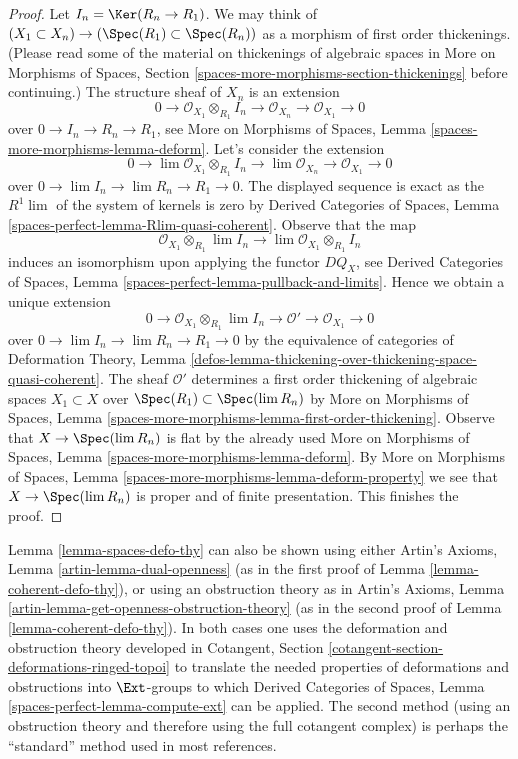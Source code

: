 \begin{proof}
\medskip\noindent
Let $I_n = \Ker(R_n \to R_1)$. We may think of
$(X_1 \subset X_n) \to (\Spec(R_1) \subset \Spec(R_n))$
as a morphism of first order thickenings. (Please read some of the material
on thickenings of algebraic spaces in More on Morphisms of Spaces, Section
\ref{spaces-more-morphisms-section-thickenings}
before continuing.) The structure sheaf of $X_n$ is an extension
$$
0 \to \mathcal{O}_{X_1} \otimes_{R_1} I_n \to
\mathcal{O}_{X_n} \to \mathcal{O}_{X_1} \to 0
$$
over $0 \to I_n \to R_n \to R_1$, see
More on Morphisms of Spaces, Lemma
\ref{spaces-more-morphisms-lemma-deform}.
Let's consider the extension
$$
0 \to \lim \mathcal{O}_{X_1} \otimes_{R_1} I_n \to
\lim \mathcal{O}_{X_n} \to \mathcal{O}_{X_1} \to 0
$$
over $0 \to \lim I_n \to \lim R_n \to R_1 \to 0$.
The displayed sequence is exact as the $R^1\lim$ of the system
of kernels is zero by Derived Categories of Spaces, Lemma
\ref{spaces-perfect-lemma-Rlim-quasi-coherent}.
Observe that the map
$$
\mathcal{O}_{X_1} \otimes_{R_1} \lim I_n \longrightarrow
\lim \mathcal{O}_{X_1} \otimes_{R_1} I_n
$$
induces an isomorphism upon applying the functor $DQ_X$, see
Derived Categories of Spaces, Lemma
\ref{spaces-perfect-lemma-pullback-and-limits}.
Hence we obtain a unique extension
$$
0 \to \mathcal{O}_{X_1} \otimes_{R_1} \lim I_n \to
\mathcal{O}' \to \mathcal{O}_{X_1} \to 0
$$
over $0 \to \lim I_n \to \lim R_n \to R_1 \to 0$
by the equivalence of categories of
Deformation Theory, Lemma
\ref{defos-lemma-thickening-over-thickening-space-quasi-coherent}.
The sheaf $\mathcal{O}'$ determines
a first order thickening of algebraic spaces $X_1 \subset X$
over $\Spec(R_1) \subset \Spec(\lim R_n)$
by More on Morphisms of Spaces, Lemma
\ref{spaces-more-morphisms-lemma-first-order-thickening}.
Observe that $X \to \Spec(\lim R_n)$ is flat by the already
used More on Morphisms of Spaces, Lemma
\ref{spaces-more-morphisms-lemma-deform}.
By More on Morphisms of Spaces, Lemma
\ref{spaces-more-morphisms-lemma-deform-property}
we see that $X \to \Spec(\lim R_n)$ is proper
and of finite presentation.
This finishes the proof.
\end{proof}

\begin{remark}
\label{remark-spaces-defo-thy}
Lemma \ref{lemma-spaces-defo-thy} can also be shown using either
Artin's Axioms, Lemma \ref{artin-lemma-dual-openness}
(as in the first proof of
Lemma \ref{lemma-coherent-defo-thy}), or using an obstruction theory
as in Artin's Axioms, Lemma \ref{artin-lemma-get-openness-obstruction-theory}
(as in the second proof of
Lemma \ref{lemma-coherent-defo-thy}).
In both cases one uses the deformation and obstruction theory developed in
Cotangent, Section \ref{cotangent-section-deformations-ringed-topoi}
to translate the needed properties of deformations and obstructions
into $\Ext$-groups to which
Derived Categories of Spaces, Lemma
\ref{spaces-perfect-lemma-compute-ext}
can be applied.
The second method (using an obstruction theory and therefore
using the full cotangent complex) is perhaps the ``standard'' method used
in most references.
\end{remark}





